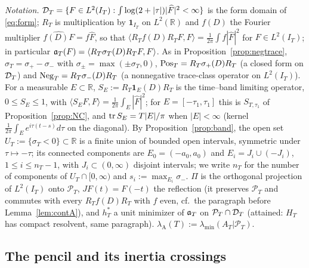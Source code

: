 \documentclass[11pt]{amsart}
\theoremstyle{definition}
\theoremstyle{remark}
\newcommand{\R}{\mathbb R}
\newcommand{\PT}{\mathcal P_T}
\newcommand{\IT}{I_T}
\newcommand{\lamA}{\lambda_{\min}(A_T|\PT)}
\newcommand{\sT}{\sigma_T}
\newcommand{\Fh}{\widehat F}
\begin{document}
\emph{Notation.} $\DT=\{F\in L^2(\IT):\int\log(2+|\tau|)|\Fh|^2<\infty\}$ is the form domain of
\eqref{eq:form}; $R_T$ is multiplication by $\mathbf 1_{\IT}$ on $L^2(\R)$ and $f(D)$ the Fourier
multiplier $\widehat{f(D)F}=f\Fh$, so that $\langle R_Tf(D)R_TF,F\rangle=\frac1{2\pi}\int f|\Fh|^2$
for $F\in L^2(\IT)$; in particular $\fa(F)=\langle R_T\sT(D)R_TF,F\rangle$. As in
Proposition~\ref{prop:negtrace}, $\sT=\sigma_+-\sigma_-$ with $\sigma_\pm=\max(\pm\sT,0)$,
$\mathrm{Pos}_T=R_T\sigma_+(D)R_T$ (a closed form on $\mathcal D_T$) and $\mathrm{Neg}_T=R_T\sigma_-(D)R_T$ (a nonnegative
trace-class operator on $L^2(\IT)$). For a measurable $E\subset\R$, $S_E:=R_T\mathbf 1_E(D)R_T$ is the
time--band limiting operator, $0\le S_E\le1$, with $\langle S_EF,F\rangle=\frac1{2\pi}\int_E|\Fh|^2$;
for $E=[-\tau_1,\tau_1]$ this is $S_{T,\tau_1}$ of Proposition~\ref{prop:NC}, and $\operatorname{tr} S_E=T|E|/\pi$
when $|E|<\infty$ (kernel $\frac1{2\pi}\int_Ee^{i\tau(t-s)}d\tau$ on the diagonal). By
Proposition~\ref{prop:band}, the open set $U_T:=\{\sT<0\}\subset\R$ is a finite union of bounded
open intervals, symmetric under $\tau\mapsto-\tau$; its connected components are
$E_0=(-a_0,a_0)$ and $E_i=J_i\cup(-J_i)$, $1\le i\le n_T-1$, with $J_i\subset(0,\infty)$ disjoint
intervals; we write $n_T$ for the number of components of $U_T\cap[0,\infty)$ and $s_i:=\max_{E_i}\sigma_-$.
$\Pi$ is the orthogonal projection of $L^2(\IT)$ onto $\PT$, $JF(t)=F(-t)$ the reflection
(it preserves $\PT$ and commutes with every $R_Tf(D)R_T$ with $f$ even, cf.\ the paragraph before
Lemma~\ref{lem:contA}), and $h^*_T$ a unit minimizer of $\mathfrak a_T$ on $\PT\cap\DT$ (attained: $H_T$ has
compact resolvent, same paragraph). $\lambda_{\mathrm A}(T):=\lamA$.

\subsection{The pencil and its inertia crossings}\label{subsec:wh-pencil}
\end{document}
